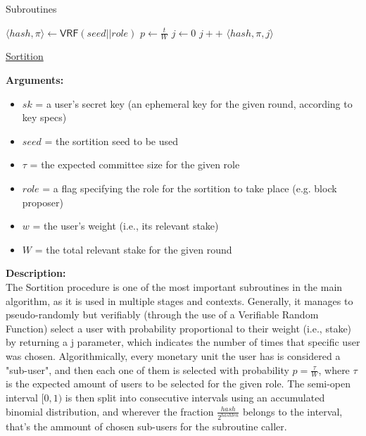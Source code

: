 \documentclass[10pt,a4paper]{article}
\begin{document}
\begin{section}{Subroutines}

\begin{algorithm}[H]
    \begin{algorithmic}[H]
        \State $ \langle hash, \pi \rangle \gets \mathsf{VRF}(seed||role)$
        \State $p \gets \frac{t}{W}$
        \State $j \gets 0$
        \While{$\frac{hash}{2^{hashlen}}\notin [ \sum_{k=0}^j\mathsf{B}(k;w,p), \sum_{k=0}^{j+1}\mathsf{B}(k;w,p))$}
            \State $j++$
        \EndWhile
        \Return $ \langle hash,\pi,j \rangle$
    \EndFunction
    \end{algorithmic}
    \caption{\underline{Sortition}}
\end{algorithm}


\noindent \textbf{Arguments:}
\begin{itemize}
    \item $sk$ = a user's secret key (an ephemeral key for the given round, according to key specs)
    \item $seed$ = the sortition seed to be used
    \item $\tau$ = the expected committee size for the given role
    \item $role$ = a flag specifying the role for the sortition to take place (e.g. block proposer)
    \item $w$ = the user's weight (i.e., its relevant stake)
    \item $W$ = the total relevant stake for the given round
\end{itemize}

\noindent \textbf{Description:}\\
The Sortition procedure is one of the most important subroutines in the main algorithm, as it is 
used in multiple stages and contexts.
Generally, it manages to pseudo-randomly but verifiably (through the use of a Verifiable Random 
Function) select a user with probability proportional
to their weight (i.e., stake) by returning a j parameter, which indicates the number of times that 
specific user was chosen.
Algorithmically, every monetary unit the user has is considered a "sub-user", and then each one 
of them is selected with probability $p = \frac{\tau}{W}$,
where $\tau$ is the expected amount of users to be selected for the given role.
The semi-open interval $[0,1)$ is then split into consecutive intervals using an accumulated 
binomial distribution, and wherever the fraction $\frac{hash}{2^{hashlen}}$
belongs to the interval, that's the ammount of chosen sub-users for the subroutine caller.\\


\end{section}
\end{document}
